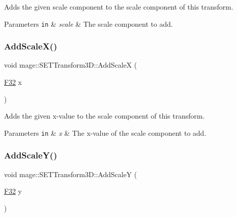 Adds the given scale component to the scale component of this transform.


\begin{DoxyParams}[1]{Parameters}
\mbox{\tt in}  & {\em scale} & The scale component to add. \\
\hline
\end{DoxyParams}
\mbox{\label{classmage_1_1_s_e_t_transform3_d_a09993145399d3a3a88a01dedde349a51}} 
\subsubsection{\texorpdfstring{Add\+Scale\+X()}{AddScaleX()}}
{\footnotesize\ttfamily void mage\+::\+S\+E\+T\+Transform3\+D\+::\+Add\+ScaleX (\begin{DoxyParamCaption}\item[{\mbox{\hyperlink{namespacemage_aa97e833b45f06d60a0a9c4fc22ae02c0}{F32}}}]{x }\end{DoxyParamCaption})\hspace{0.3cm}{\ttfamily [noexcept]}}

Adds the given x-\/value to the scale component of this transform.


\begin{DoxyParams}[1]{Parameters}
\mbox{\tt in}  & {\em x} & The x-\/value of the scale component to add. \\
\hline
\end{DoxyParams}
\mbox{\label{classmage_1_1_s_e_t_transform3_d_ab1efcb1b94d1758e3464921a8c68ff68}} 
\subsubsection{\texorpdfstring{Add\+Scale\+Y()}{AddScaleY()}}
{\footnotesize\ttfamily void mage\+::\+S\+E\+T\+Transform3\+D\+::\+Add\+ScaleY (\begin{DoxyParamCaption}\item[{\mbox{\hyperlink{namespacemage_aa97e833b45f06d60a0a9c4fc22ae02c0}{F32}}}]{y }\end{DoxyParamCaption})\hspace{0.3cm}{\ttfamily [noexcept]}}

